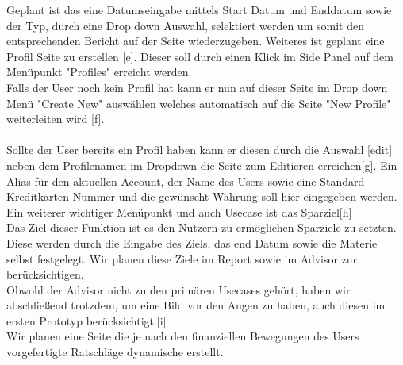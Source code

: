 \documentclass[runningheads,a4paper]{llncs}
\begin{document}
Geplant ist das eine Datumseingabe mittels Start Datum und Enddatum sowie der Typ, durch eine Drop down Auswahl, selektiert werden um somit den entsprechenden Bericht auf der Seite wiederzugeben. Weiteres ist geplant eine Profil Seite zu erstellen [e]. 
Dieser soll durch einen Klick im Side Panel auf dem Menüpunkt "Profiles" erreicht werden.\\ Falls der User noch kein Profil hat kann er nun auf dieser Seite im Drop down Menü "Create New" auswählen welches automatisch auf die Seite "New Profile" weiterleiten wird [f].\\\\ Sollte der User bereits ein Profil haben kann er diesen durch die Auswahl [edit] neben dem Profilenamen im Dropdown die Seite zum Editieren erreichen[g]. Ein Alias für den aktuellen Account, der Name des Users sowie eine Standard Kreditkarten Nummer und die gewünscht Währung soll hier eingegeben werden. Ein weiterer wichtiger Menüpunkt und auch Usecase ist das Sparziel[h] \\Das Ziel dieser Funktion ist es den Nutzern zu ermöglichen Sparziele zu setzten. Diese werden durch die Eingabe des Ziels, das end Datum sowie die Materie selbst festgelegt. Wir planen diese Ziele im Report sowie im Advisor zur berücksichtigen. \\ Obwohl der Advisor nicht zu den primären Usecases gehört, haben wir abschließend trotzdem, um eine Bild vor den Augen zu haben, auch diesen im ersten Prototyp berücksichtigt.[i] \\Wir planen eine Seite die je nach den finanziellen Bewegungen des Users vorgefertigte Ratschläge dynamische erstellt. 
\end{document}
